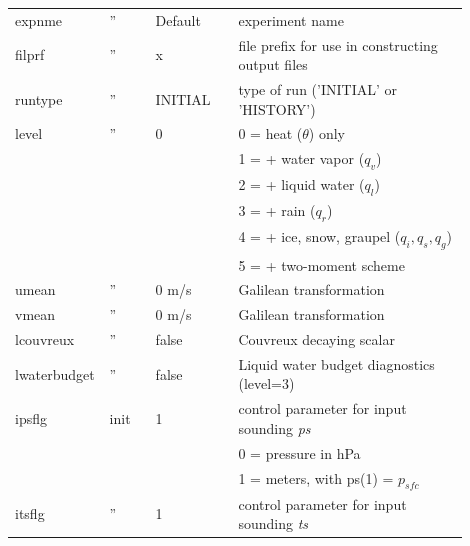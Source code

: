 \documentclass[11pt,a4paper]{article}
\begin{document}
\begin{longtable}[htb]{p{0.12\linewidth}p{0.1\linewidth}p{0.18\linewidth}p{0.5\linewidth}}
expnme       &  ''  & Default             & experiment name                                       \\
filprf       &  ''  & x                   & file prefix for use in constructing output files      \\
runtype      &  ''  & INITIAL             & type of run ('INITIAL' or 'HISTORY')                  \\ 
level        &  ''  & 0                   & \hspace{2mm} 0 = heat ($\theta$) only                 \\ 
             &      &                     & \hspace{2mm} 1 = + water vapor ($q_v$)                \\
             &      &                     & \hspace{2mm} 2 = + liquid water ($q_l$)               \\
             &      &                     & \hspace{2mm} 3 = + rain ($q_r$)                       \\
             &      &                     & \hspace{2mm} 4 = + ice, snow, graupel ($q_i,q_s,q_g$) \\
             &      &                     & \hspace{2mm} 5 = + two-moment scheme                  \\
umean        &  ''  & 0 m/s               & Galilean transformation                               \\ 
vmean        &  ''  & 0 m/s               & Galilean transformation                               \\ 
lcouvreux    &  ''  & false               & Couvreux decaying scalar                              \\
lwaterbudget &  ''  & false               & Liquid water budget diagnostics (level=3)             \\
\hline
ipsflg       & init & 1                   & control parameter for input sounding \textit{ps}      \\
             &      &                     & \hspace{2mm} 0 = pressure in hPa                      \\
             &      &                     & \hspace{2mm} 1 = meters, with ps(1) = $p_{sfc}$       \\
itsflg       &  ''  & 1                   & control parameter for input sounding \textit{ts}      \\ 

\end{longtable}
\end{document}
